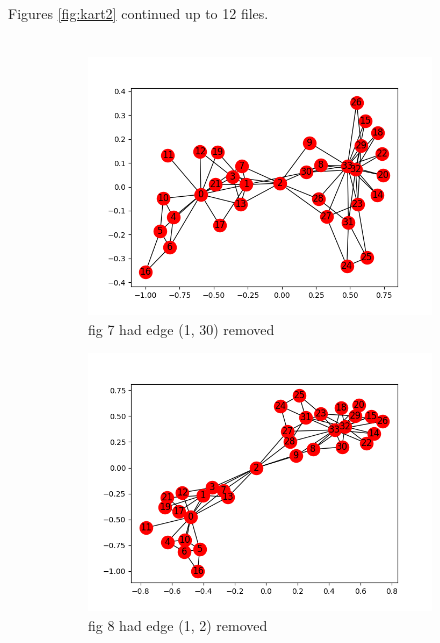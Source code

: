 \documentclass[10pt,letterpaper]{article}
\begin{document}
Figures \ref{fig:kart2} continued up to 12 files.\\
\\
\begin{figure}[H]
  \centering
   \begin{subfigure}[b]{0.4\linewidth}
     \includegraphics[width=\linewidth]{karate07.png} 
     \caption{fig 7 had edge (1, 30) removed}
  \end{subfigure}
   \begin{subfigure}[b]{0.4\linewidth}
     \includegraphics[width=\linewidth]{karate08.png} 
     \caption{fig 8 had edge (1, 2) removed}
  \end{subfigure}
   \begin{subfigure}[b]{0.4\linewidth}

\end{subfigure}
\end{figure}
\end{document}
